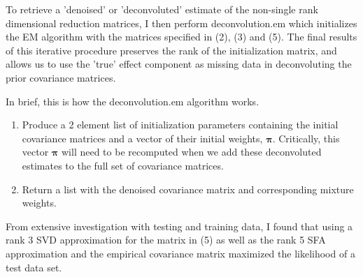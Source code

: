 \documentclass[10pt]{article}
\begin{document}
\begin{itemize}


To retrieve a 'denoised' or 'deconvoluted' estimate of the non-single rank dimensional reduction matrices, I then perform deconvolution.em which initializes the EM algorithm with  the matrices specified in (2), (3) and (5). The final results of this iterative procedure preserves the rank of the initialization matrix, and allows us to use the 'true' effect component as missing data in deconvoluting the prior covariance matrices.

In brief, this is how the deconvolution.em algorithm works.

\begin{enumerate}
\item Produce a 2 element list of initialization parameters containing the initial covariance matrices and a vector of their initial weights, $\mathbf{\pi}$. Critically, this vector $\mathbf{\pi}$ will need to be recomputed when we add these deconvoluted estimates to the full set of covariance matrices.

\item Return a list with the denoised covariance matrix and corresponding mixture weights.
\end {enumerate}

From extensive investigation with testing and training data, I found that using a rank 3 SVD approximation for the matrix in (5) as well as the rank 5 SFA approximation and the empirical covariance matrix maximized the likelihood of a test data set. 


\end{itemize}
\end{document}
